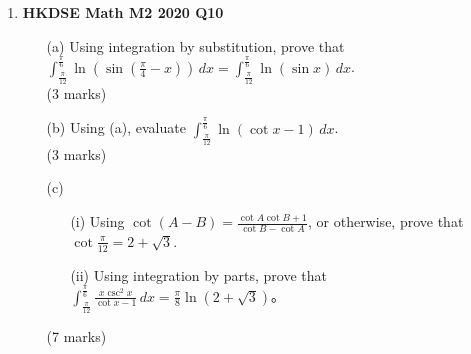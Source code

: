 \documentclass[12pt]{article}
\begin{document}
\begin{enumerate}
	\item \textbf{HKDSE Math M2 2020 Q10}
	\begin{enumerate}
		\item [(a)]Using integration by substitution, prove that $\displaystyle \int_{\frac{\pi}{12}}^{\frac{\pi}{6}}  \ln{\left(\sin{\left(\frac{\pi}{4} - x\right)}\right)}\,dx = \int_{\frac{\pi}{12}}^{\frac{\pi}{6}}  \ln{(\sin{x})}\,dx$. \\(3 marks)
		\item [(b)] Using (a), evaluate $\displaystyle \int_{\frac{\pi}{12}}^{\frac{\pi}{6}}  \ln{(\cot{x} - 1)}\,dx$. \\(3 marks)
		\item [(c)] 
		\begin{enumerate}
			\item [(i)] Using $\cot{(A-B)} = \displaystyle \frac{\cot{A}\cot{B}+1}{\cot{B} - \cot{A}}$, or otherwise, prove that $\displaystyle \cot{\frac{\pi}{12}} = 2 + \sqrt{3}$. 
			\item [(ii)] Using integration by parts, prove that $\displaystyle\int_{ \frac{\pi}{12}}^{\frac{\pi}{6}}  \frac{x\csc^2{x}}{\cot{x} -1}\,dx = \frac{\pi}{8} \ln{(2 + \sqrt{3})}$。
		\end{enumerate}
	(7 marks)
	\end{enumerate}


\end{enumerate}
\end{document}
